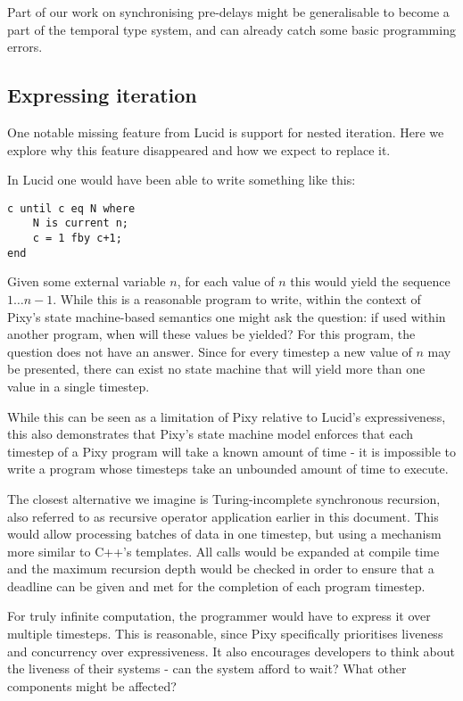 \documentclass{scrartcl}
\begin{document}
    Part of our work on synchronising pre-delays might be generalisable to become a part of the temporal type system, and can already catch some basic programming errors.
    
    \subsection{Expressing iteration}
    
    One notable missing feature from Lucid is support for nested iteration. Here we explore why this feature disappeared and how we expect to replace it.
    
    In Lucid one would have been able to write something like this:
    
    \begin{lstlisting}
c until c eq N where
    N is current n;
    c = 1 fby c+1;
end
    \end{lstlisting}
    
    Given some external variable $n$, for each value of $n$ this would yield the sequence $1 \dots n-1$. While this is a reasonable program to write, within the context of Pixy's state machine-based semantics one might ask the question: if used within another program, when will these values be yielded? For this program, the question does not have an answer. Since for every timestep a new value of $n$ may be presented, there can exist no state machine that will yield more than one value in a single timestep.
    
    While this can be seen as a limitation of Pixy relative to Lucid's expressiveness, this also demonstrates that Pixy's state machine model enforces that each timestep of a Pixy program will take a known amount of time - it is impossible to write a program whose timesteps take an unbounded amount of time to execute.
    
    The closest alternative we imagine is Turing-incomplete synchronous recursion, also referred to as recursive operator application earlier in this document. This would allow processing batches of data in one timestep, but using a mechanism more similar to C++'s templates. All calls would be expanded at compile time and the maximum recursion depth would be checked in order to ensure that a deadline can be given and met for the completion of each program timestep.
    
    For truly infinite computation, the programmer would have to express it over multiple timesteps. This is reasonable, since Pixy specifically prioritises liveness and concurrency over expressiveness. It also encourages developers to think about the liveness of their systems - can the system afford to wait? What other components might be affected?
    
\end{document}
